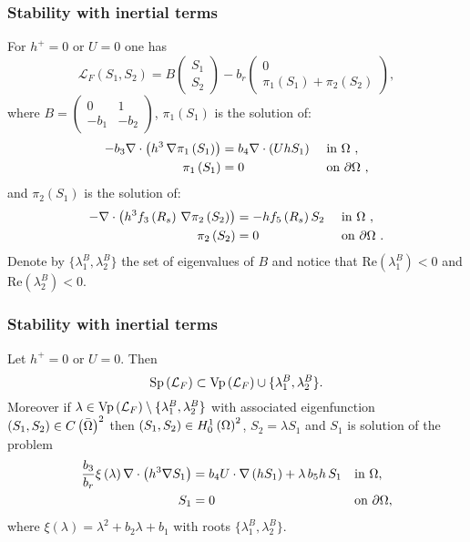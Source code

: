 \documentclass[10pt,aspectratio=169]{beamer}
\newenvironment{nalign}{
	\begin{equation}
	\begin{aligned}
}{
	\end{aligned}
	\end{equation}
	\ignorespacesafterend
}
\begin{document}
\begin{frame}
\frametitle{Stability with inertial terms}\vspace*{0.5cm}
For $h^+=0$ or $U=0$ one has
\begin{equation}\label{eq:L_F}
\mathcal{L}_F\left(S_1,S_2\right)=B\begin{pmatrix}
S_1\\S_2
\end{pmatrix}-b_r\begin{pmatrix}
0\\\pi_1\left(S_1\right)+\pi_2\left(S_2\right)
\end{pmatrix},
\end{equation}
where $B=\begin{pmatrix}0&1\\-b_1&-b_2
\end{pmatrix}$, $\pi_1(S_1)$ is the solution of:
\begin{nalign}
	-b_3\nabla\cdot \left(h^3 \,\nabla \pi_1\left(S_1\right)\right)&=b_4\nabla\cdot \left(UhS_1\right)&&\textnormal{ in }  \Omega~,\\
	\pi_1\left(S_1\right)&=0 &&\textnormal{ on } \partial \Omega~,
	\label{eq:pi1-triv-case}
\end{nalign}
and $\pi_2(S_1)$ is the solution of:
\begin{nalign}
	-\nabla\cdot \left(h^3f_3\left(R_s\right) \,\nabla \pi_2\left(S_2\right)\right)&=-hf_5\left(R_s\right)S_2&&\textnormal{ in }  \Omega~,\\
	\pi_2\left(S_2\right)&=0 &&\textnormal{ on } \partial \Omega~.
	\label{eq:def:pi2}
\end{nalign}
Denote by $\{\lambda_1^B,\lambda_2^B\}$ the set of eigenvalues of $B$ and notice that $\mbox{Re}\left(\lambda_1^B\right)<0$ and $\mbox{Re}\left(\lambda_2^B\right)<0$.
\end{frame}


\begin{frame}
\frametitle{Stability with inertial terms}
\vspace*{0.5cm}
\begin{lemma}\label{lemma:spec-L_F}
	Let $h^+=0$ or $U=0$. Then
	\begin{equation}
	\textnormal{Sp}\left(\mathcal{L}_F\right)\subset \textnormal{Vp}\left(\mathcal{L}_F\right)\cup \{\lambda_1^B,\lambda_2^B\}.
	\end{equation}
	Moreover if $\lambda\in \textnormal{Vp}\left(\mathcal{L}_F\right)\setminus\{\lambda_1^B,\lambda_2^B\}$ with associated eigenfunction $\left(S_1,S_2\right)\in C\left(\bar{\Omega}\right)^2$ then $\left(S_1,S_2\right)\in H^1_0\left(\Omega\right)^2$, $S_2=\lambda S_1$ and $S_1$ is solution of the problem
	\begin{align*}
	\frac{b_3}{b_r}\xi\left(\lambda\right)\nabla\cdot\left(h^3\nabla S_1\right)&=b_4 U\cdot\nabla\left(hS_1\right)+\lambda\, b_5 h\, S_1 && \textnormal{in }\Omega,\\
	S_1&=0&&\textnormal{on }\partial\Omega,
	\end{align*}
	where $\xi\left(\lambda\right)=\lambda^2+b_2\lambda+b_1$ with roots $\{\lambda_1^B,\lambda_2^B\}$.
\end{lemma}

\end{frame}
\end{document}
